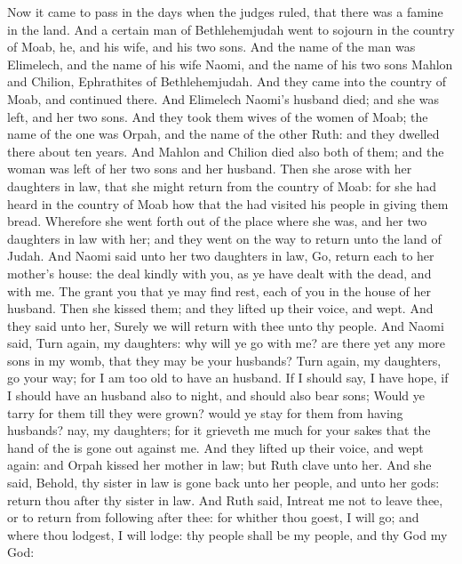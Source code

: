 
\begin{biblechapter} %
 Now it came to pass in the days when the judges ruled, that there was a famine in the land. And a certain man of Bethlehemjudah went to sojourn in the country of Moab, he, and his wife, and his two sons.
\verse And the name of the man was Elimelech, and the name of his wife Naomi, and the name of his two sons Mahlon and Chilion, Ephrathites of Bethlehemjudah. And they came into the country of Moab, and continued there.
\verse And Elimelech Naomi's husband died; and she was left, and her two sons.
\verse And they took them wives of the women of Moab; the name of the one was Orpah, and the name of the other Ruth: and they dwelled there about ten years.
\verse And Mahlon and Chilion died also both of them; and the woman was left of her two sons and her husband.
 Then she arose with her daughters in law, that she might return from the country of Moab: for she had heard in the country of Moab how that the \LORD had visited his people in giving them bread.
\verse Wherefore she went forth out of the place where she was, and her two daughters in law with her; and they went on the way to return unto the land of Judah.
\verse And Naomi said unto her two daughters in law, Go, return each to her mother's house: the \LORD deal kindly with you, as ye have dealt with the dead, and with me.
\verse The \LORD grant you that ye may find rest, each of you in the house of her husband. Then she kissed them; and they lifted up their voice, and wept.
\verse And they said unto her, Surely we will return with thee unto thy people.
\verse And Naomi said, Turn again, my daughters: why will ye go with me? are there yet any more sons in my womb, that they may be your husbands?
\verse Turn again, my daughters, go your way; for I am too old to have an husband. If I should say, I have hope, if I should have an husband also to night, and should also bear sons;
\verse Would ye tarry for them till they were grown? would ye stay for them from having husbands? nay, my daughters; for it grieveth me much for your sakes that the hand of the \LORD is gone out against me.
\verse And they lifted up their voice, and wept again: and Orpah kissed her mother in law; but Ruth clave unto her.
\verse And she said, Behold, thy sister in law is gone back unto her people, and unto her gods: return thou after thy sister in law.
\verse And Ruth said, Intreat me not to leave thee, or to return from following after thee: for whither thou goest, I will go; and where thou lodgest, I will lodge: thy people shall be my people, and thy God my God:

\end{biblechapter}
